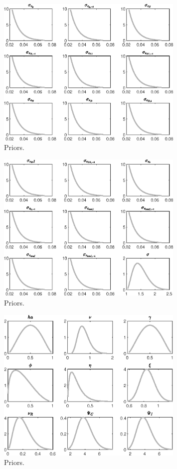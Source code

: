  
\begin{figure}[H]
\centering
\includegraphics[width=0.80\textwidth]{BRS_sectoral_wo_vcu/graphs/BRS_sectoral_wo_vcu_Priors1}
\caption{Priors.}\label{Fig:Priors:1}
\end{figure}
\begin{figure}[H]
\centering
\includegraphics[width=0.80\textwidth]{BRS_sectoral_wo_vcu/graphs/BRS_sectoral_wo_vcu_Priors2}
\caption{Priors.}\label{Fig:Priors:2}
\end{figure}
\begin{figure}[H]
\centering
\includegraphics[width=0.80\textwidth]{BRS_sectoral_wo_vcu/graphs/BRS_sectoral_wo_vcu_Priors3}
\caption{Priors.}\label{Fig:Priors:3}
\end{figure}
